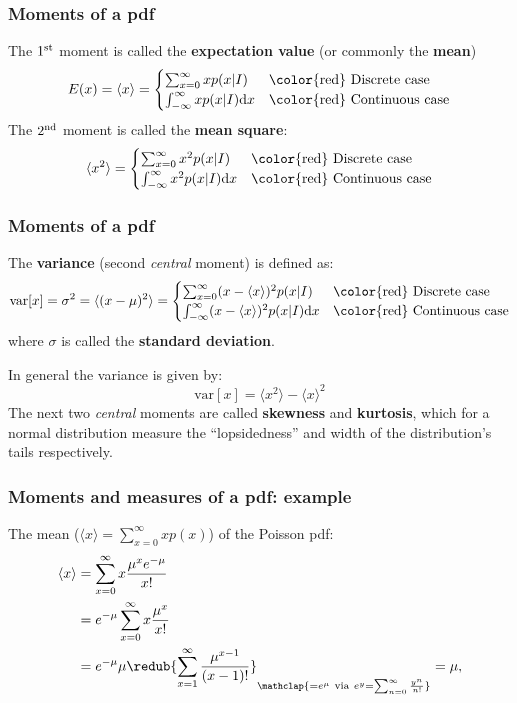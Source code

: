 \begin{frame}

\frametitle{Moments of a pdf}
\label{momentsofapdf}

The $1^{\rm st}$ moment is called the \textbf{expectation value} (or commonly the \textbf{mean})
\[
E(x) = \langle x \rangle = 
\begin{cases}
    \sum_{x=0}^{\infty} x p(x|I) & \text{\color{red} Discrete case}\\
    \int_{-\infty}^{\infty} x p(x|I) {\rm d}x & \text{\color{red} Continuous case}
\end{cases}
\]
The $2^{\rm nd}$ moment is called the \textbf{mean square}:
\[
\langle x^2 \rangle = 
\begin{cases}
    \sum_{x=0}^{\infty} x^2 p(x|I) & \text{\color{red} Discrete case}\\
    \int_{-\infty}^{\infty} x^2 p(x|I) {\rm d}x & \text{\color{red} Continuous case}
\end{cases}
\]

\end{frame}

\begin{frame}

\frametitle{Moments of a pdf}
\label{momentsofapdf}

The \textbf{variance} (second \emph{central} moment) is defined as:
\[
\text{var}[x] = \sigma^2 = \langle (x-\mu)^2 \rangle = 
\begin{cases}
    \sum_{x=0}^{\infty} (x-\langle x \rangle)^2 p(x|I) & \text{\color{red} Discrete case}\\
    \int_{-\infty}^{\infty} (x-\langle x \rangle)^2 p(x|I) {\rm d}x & \text{\color{red} Continuous 
case}
\end{cases}
\]
where $\sigma$ is called the \textbf{standard deviation}.

In general the variance is given by:
\[
\boxed{\text{var}[x] = \langle x^2 \rangle - \langle x \rangle^2}
\]
The next two \emph{central} moments are called \textbf{skewness} and \textbf{kurtosis}, which for a normal distribution
measure the ``lopsidedness'' and width of the distribution's tails respectively.

\end{frame}

\begin{frame}

\frametitle{Moments and measures of a pdf: example}
\label{momentsandmeasuresofapdf:example}

The mean ($\langle x \rangle = \sum_{x=0}^{\infty} xp(x)$) of the Poisson pdf:
\begin{align*}
    \langle x \rangle &= \sum_{x=0}^{\infty} x\frac{\mu^x e^{-\mu}}{x!} \\
    &= e^{-\mu}\sum_{x=0}^{\infty} x\frac{\mu^x }{x!} \\
    &= e^{-\mu}\mu\redub{\sum_{x=1}^{\infty}\frac{\mu^{x-1}}{(x-1)!}}_{\mathclap{=e^\mu~\text{via}~
    e^y = \sum_{n=0}^{\infty}\frac{y^n}{n!}}} = \mu,
\end{align*}

\end{frame}

